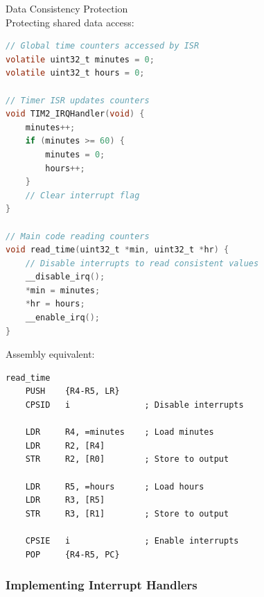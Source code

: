 \begin{example2}{Data Consistency Protection}\\
Protecting shared data access:

\begin{lstlisting}[language=C, style=basesmol]
// Global time counters accessed by ISR
volatile uint32_t minutes = 0;
volatile uint32_t hours = 0;

// Timer ISR updates counters
void TIM2_IRQHandler(void) {
    minutes++;
    if (minutes >= 60) {
        minutes = 0;
        hours++;
    }
    // Clear interrupt flag
}

// Main code reading counters
void read_time(uint32_t *min, uint32_t *hr) {
    // Disable interrupts to read consistent values
    __disable_irq();
    *min = minutes;
    *hr = hours;
    __enable_irq();
}
\end{lstlisting}

Assembly equivalent:
\begin{lstlisting}[language=armasm, style=basesmol]
read_time
    PUSH    {R4-R5, LR}
    CPSID   i               ; Disable interrupts
    
    LDR     R4, =minutes    ; Load minutes
    LDR     R2, [R4]
    STR     R2, [R0]        ; Store to output
    
    LDR     R5, =hours      ; Load hours
    LDR     R3, [R5]
    STR     R3, [R1]        ; Store to output
    
    CPSIE   i               ; Enable interrupts
    POP     {R4-R5, PC}
\end{lstlisting}
\end{example2}

\columnbreak

\subsubsection{Implementing Interrupt Handlers}

